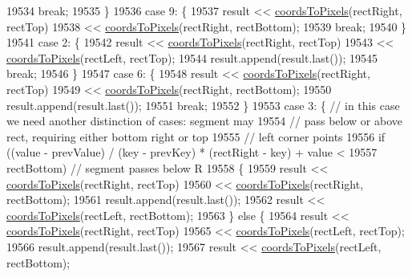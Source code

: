 \begin{DoxyCode}
19534       \textcolor{keywordflow}{break};
19535     \}
19536     \textcolor{keywordflow}{case} 9: \{
19537       result << \hyperlink{class_q_c_p_abstract_plottable_ade710a776104b14c1c835168ce1bfc5c}{coordsToPixels}(rectRight, rectTop)
19538              << \hyperlink{class_q_c_p_abstract_plottable_ade710a776104b14c1c835168ce1bfc5c}{coordsToPixels}(rectRight, rectBottom);
19539       \textcolor{keywordflow}{break};
19540     \}
19541     \textcolor{keywordflow}{case} 2: \{
19542       result << \hyperlink{class_q_c_p_abstract_plottable_ade710a776104b14c1c835168ce1bfc5c}{coordsToPixels}(rectRight, rectTop)
19543              << \hyperlink{class_q_c_p_abstract_plottable_ade710a776104b14c1c835168ce1bfc5c}{coordsToPixels}(rectLeft, rectTop);
19544       result.append(result.last());
19545       \textcolor{keywordflow}{break};
19546     \}
19547     \textcolor{keywordflow}{case} 6: \{
19548       result << \hyperlink{class_q_c_p_abstract_plottable_ade710a776104b14c1c835168ce1bfc5c}{coordsToPixels}(rectRight, rectTop)
19549              << \hyperlink{class_q_c_p_abstract_plottable_ade710a776104b14c1c835168ce1bfc5c}{coordsToPixels}(rectRight, rectBottom);
19550       result.append(result.last());
19551       \textcolor{keywordflow}{break};
19552     \}
19553     \textcolor{keywordflow}{case} 3: \{ \textcolor{comment}{// in this case we need another distinction of cases: segment may}
19554               \textcolor{comment}{// pass below or above rect, requiring either bottom right or top}
19555               \textcolor{comment}{// left corner points}
19556       \textcolor{keywordflow}{if} ((value - prevValue) / (key - prevKey) * (rectRight - key) + value <
19557           rectBottom) \textcolor{comment}{// segment passes below R}
19558       \{
19559         result << \hyperlink{class_q_c_p_abstract_plottable_ade710a776104b14c1c835168ce1bfc5c}{coordsToPixels}(rectRight, rectTop)
19560                << \hyperlink{class_q_c_p_abstract_plottable_ade710a776104b14c1c835168ce1bfc5c}{coordsToPixels}(rectRight, rectBottom);
19561         result.append(result.last());
19562         result << \hyperlink{class_q_c_p_abstract_plottable_ade710a776104b14c1c835168ce1bfc5c}{coordsToPixels}(rectLeft, rectBottom);
19563       \} \textcolor{keywordflow}{else} \{
19564         result << \hyperlink{class_q_c_p_abstract_plottable_ade710a776104b14c1c835168ce1bfc5c}{coordsToPixels}(rectRight, rectTop)
19565                << \hyperlink{class_q_c_p_abstract_plottable_ade710a776104b14c1c835168ce1bfc5c}{coordsToPixels}(rectLeft, rectTop);
19566         result.append(result.last());
19567         result << \hyperlink{class_q_c_p_abstract_plottable_ade710a776104b14c1c835168ce1bfc5c}{coordsToPixels}(rectLeft, rectBottom);

\end{DoxyCode}
